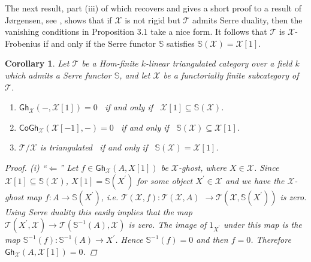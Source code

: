 \documentclass[oneside, a4paper,reqno]{amsart}
\numberwithin{equation}{section}
\newtheorem{cor}[thm]{Corollary}
\theoremstyle{definition}
\begin{document}
The next result, part (iii) of which  recovers and gives a short proof to a result of J\o rgensen, see \cite[Theorem 2.3]{PJ}, shows that if ${\mathcal X}$ is not rigid but ${\mathcal T}$ admits Serre duality, then the vanishing conditions in Proposition $3.1$ take a nice form. It follows that  ${\mathcal T}$ is ${\mathcal X}$-Frobenius if and only if the Serre functor $\mathbb S$ satisfies $\mathbb S({\mathcal X}) = {\mathcal X}[1]$.    

\begin{cor} Let ${\mathcal T}$ be a Hom-finite $k$-linear triangulated category over a field $k$ which admits a Serre functor $\mathbb S$, and let ${\mathcal X}$ be  a  functorially finite subcategory of ${\mathcal T}$. 
\begin{enumerate}
\item $\mathsf{Gh}_{\mathcal X}(-,{\mathcal X}[1]) = 0$ \,  if and only if \, ${\mathcal X}[1] \subseteq \mathbb S({\mathcal X})$. 
\item $\mathsf{CoGh}_{\mathcal X}({\mathcal X}[-1],-) = 0$ \, if and only if \, $\mathbb S({\mathcal X}) \subseteq {\mathcal X}[1]$. 
\item ${\mathcal T}/{\mathcal X}$ is triangulated \, if and only if \,  $\mathbb S({\mathcal X})  = {\mathcal X}[1]$. 
\end{enumerate}
\begin{proof} (i) ``$\Longleftarrow$'' Let $f \in \mathsf{Gh}_{\mathcal X}(A,X[1])$ be ${\mathcal X}$-ghost, where $X \in {\mathcal X}$.  Since ${\mathcal X}[1] \subseteq \mathbb S({\mathcal X})$, $X[1] = \mathbb S(X^{\prime})$ for some object $X^{\prime} \in {\mathcal X}$ and we have the ${\mathcal X}$-ghost map $f \colon A {\longrightarrow} \mathbb S(X^{\prime})$, i.e. ${\mathcal T}({\mathcal X},f) \colon {\mathcal T}({\mathcal X},A)$ ${\longrightarrow} {\mathcal T}({\mathcal X},\mathbb S(X^{\prime}))$ is zero. Using Serre duality this easily implies that  the map ${\mathcal T}(X^{\prime},{\mathcal X}) {\longrightarrow} {\mathcal T}(\mathbb S^{-1}(A),{\mathcal X})$ is zero. The image of $1_{X^{\prime}}$ under this map is the map  $\mathbb S^{-1}(f) \colon \mathbb S^{-1}(A) {\longrightarrow} X^{\prime}$. Hence $\mathbb S^{-1}(f) = 0$ and then $f = 0$. Therefore $\mathsf{Gh}_{\mathcal X}(A,{\mathcal X}[1]) = 0$. 


\end{proof}
\end{cor}
\end{document}
